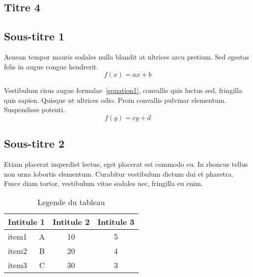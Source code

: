 \documentclass{jdt-tis}
\begin{document}
\begin{content}
  \section{Titre 4}

  \subsection{Sous-titre 1}
  Aenean tempor mauris sodales nulla blandit at ultrices arcu pretium. Sed egestas felis in augue congue hendrerit.
  \begin{equation}
    f(x) = ax + b
    \label{equation1}
  \end{equation}

  Vestibulum risus augue formulae~\eqref{equation1}, convallis quis luctus sed, fringilla quis sapien. Quisque ut ultrices odio. Proin convallis pulvinar elementum. Suspendisse potenti.
  \begin{equation*}
    f(y) = cy + d
  \end{equation*}

  \subsection{Sous-titre 2}
  Etiam placerat imperdiet lectus, eget placerat est commodo eu. In rhoncus tellus non urna lobortis elementum. Curabitur vestibulum dictum dui et pharetra. Fusce diam tortor, vestibulum vitae sodales nec, fringilla eu enim.


  \begin{table}[H]
    \centering
    \begin{tabular}{|lr|c|c|}
      \hline
      \multicolumn{2}{|l|}{\textbf{Intitule 1}} & \textbf{Intitule 2} & \textbf{Intitule 3} \\
      \hline
      \hline
      item1 & A & 10 & 5 \\
      item2 & B & 20 & 4 \\
      item3 & C & 30 & 3 \\
      \hline
    \end{tabular}
    \caption{Legende du tableau}
    \label{tab:tableau}
  \end{table}


\end{content}
\end{document}

